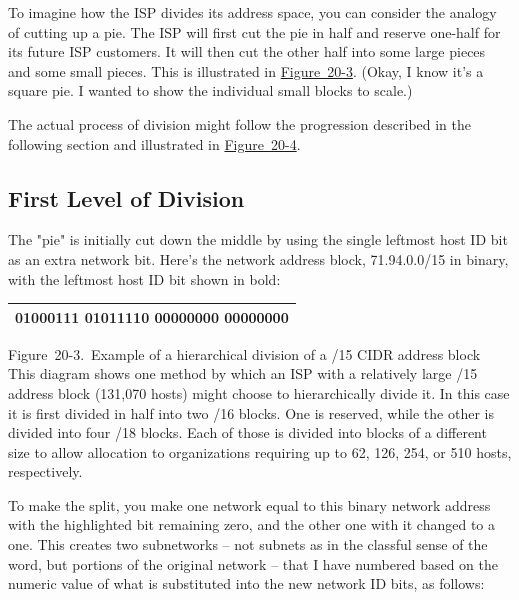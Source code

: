 \documentclass[b5paper,11pt]{memoir}
\begin{document}
To imagine how the ISP divides its address space, you can consider the
analogy of cutting up a pie. The ISP will first cut the pie in half and
reserve one-half for its future ISP customers. It will then cut the
other half into some large pieces and some small pieces. This is
illustrated in
\protect\hyperlink{ch20s04.htmlux5cux23example_of_a_hierarchical_division_of_a_}{Figure~20-3}.
(Okay, I know it's a square pie. I wanted to show the individual small
blocks to scale.)

The actual process of division might follow the progression described in
the following section and illustrated in
\protect\hyperlink{ch20s04.htmlux5cux23hierarchical_address_division_using_cidr}{Figure~20-4}.

\subsection[First Level of
Division]{\texorpdfstring{\protect\hypertarget{ch20s04.htmlux5cux23first_level_of_division}{}{}First
Level of Division}{First Level of Division}}

The "pie" is initially cut down the middle by using the single leftmost
host ID bit as an extra network bit. Here's the network address block,
71.94.0.0/15 in binary, with the leftmost host ID bit shown in bold:

\begin{longtable}[]{@{}l@{}}
\toprule
\endhead
01000111 0101111{\textbf{0}} 00000000 00000000\tabularnewline
\bottomrule
\end{longtable}

\protect\hypertarget{ch20s04.htmlux5cux23example_of_a_hierarchical_division_of_a_}{}{}

\protect\hypertarget{ch20s04.htmlux5cux23I_mediaobject6_d1e22480}{}{}

Figure~20-3.~Example of a hierarchical division of a /15 CIDR address
block This diagram shows one method by which an ISP with a relatively
large /15 address block (131,070 hosts) might choose to hierarchically
divide it. In this case it is first divided in half into two /16 blocks.
One is reserved, while the other is divided into four /18 blocks. Each
of those is divided into blocks of a different size to allow allocation
to organizations requiring up to 62, 126, 254, or 510 hosts,
respectively.

To make the split, you make one network equal to this binary network
address with the highlighted bit remaining zero, and the other one with
it changed to a one. This creates two subnetworks -- not subnets as in
the classful sense of the word, but portions of the original
network -- that I have numbered based on the numeric value of what is
substituted into the new network ID bits, as follows:
\end{document}
